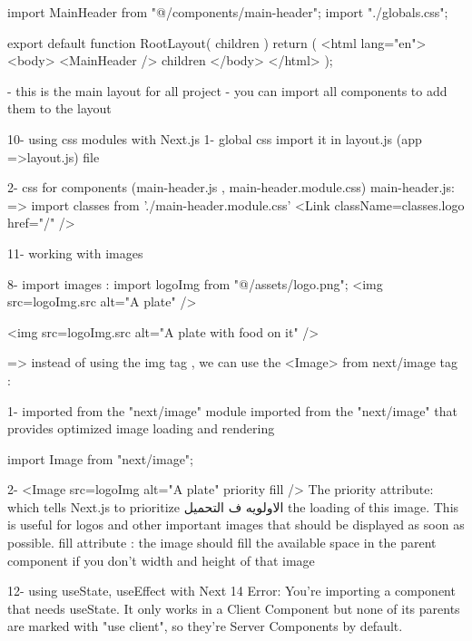             import MainHeader from "@/components/main-header";
            import "./globals.css";


            export default function RootLayout({ children }) {
                        return (
                            <html lang="en">
                            <body>
                                <MainHeader />
                                {children}
                            </body>
                            </html>
                        );
                        }

          -  this is the main layout for all project 
          -  you can import all components to add them to the layout


10- using css modules with Next.js
    1- global css import it  in layout.js (app =>layout.js) file 

    2- css for components (main-header.js , main-header.module.css)
        main-header.js:
             => import classes from './main-header.module.css'
               <Link  className={classes.logo} href="/" />

11- working with images

        8- import images :
            import logoImg from "@/assets/logo.png";
            <img src={logoImg.src} alt="A plate" />


            <img src={logoImg.src} alt="A plate with food on it" />
        
    => instead of using the img tag , we can use the <Image> from next/image tag :

            1-  imported from the "next/image" module  imported from the "next/image"
                that provides optimized image loading and rendering

                import Image from "next/image";

            2- <Image src={logoImg} alt="A plate" priority fill />
                The priority attribute: which tells Next.js to prioritize الاولويه ف التحميل the loading of this image.
                This is useful for logos and other important images that should be displayed as soon as possible.
                fill attribute : the image should fill the available space in the parent component if you don't width and height of that image


12- using useState, useEffect with Next 14 
    Error: You're importing a component that needs useState. It only works in a Client Component but none of its parents are marked with "use client", so they're Server Components by default.

